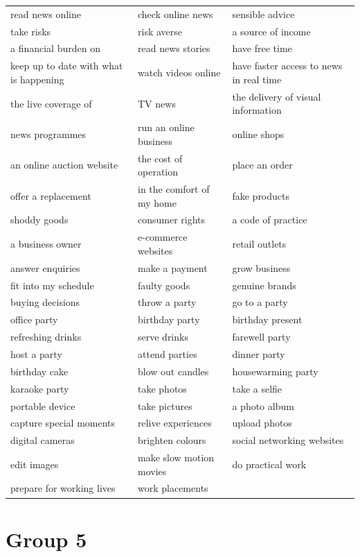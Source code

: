 \documentclass[10pt,a4paper]{article}
\begin{document}
{\begin{longtable}{@{}*{3}{p{}}@{}}
read news online & check online news & sensible advice \\
take risks & risk averse & a source of income \\
a financial burden on & read news stories & have free time \\
keep up to date with what is happening & watch videos online & have faster access to news in real time \\
the live coverage of & TV news & the delivery of visual information \\
news programmes & run an online business & online shops \\
an online auction website & the cost of operation & place an order \\
offer a replacement & in the comfort of my home & fake products \\
shoddy goods & consumer rights & a code of practice \\
a business owner & e-commerce websites & retail outlets \\
answer enquiries & make a payment & grow business \\
fit into my schedule & faulty goods & genuine brands \\
buying decisions & throw a party & go to a party \\
office party & birthday party & birthday present \\
refreshing drinks & serve drinks & farewell party \\
host a party & attend parties & dinner party \\
birthday cake & blow out candles & housewarming party \\
karaoke party & take photos & take a selfie \\
portable device & take pictures & a photo album \\
capture special moments & relive experiences & upload photos \\
digital cameras & brighten colours & social networking websites \\
edit images & make slow motion movies & do practical work \\
prepare for working lives & work placements &  \\
\end{longtable}}

\section*{Group 5}
\end{document}
